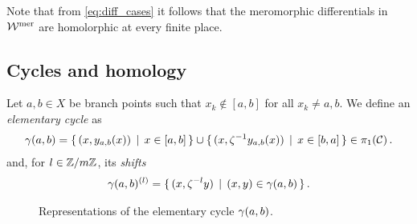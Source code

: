 \documentclass[main.tex]{subfiles}
\begin{document}
     \begin{rmk}
      Note that from \eqref{eq:diff_cases} it follows that the meromorphic differentials in $\mathcal{W}^{\text{mer}}$ are homolorphic at every finite place. 
     \end{rmk}
  
  \subsection{Cycles and homology}
    
   
   \begin{defn}
   Let $a, b \in X$ be branch points such that $x_k \not\in [a,b]$ for all $x_k \ne a,b$. We define an \textit{elementary cycle} as
   \begin{align}
    \gamma(a,b) = \{ \, (x,y_{a,b}(x)) \, \mid \, x \in [a,b] \, \} \cup \{ \,(x,\zeta^{-1} y_{a,b}(x)) \, \mid \, x \in [b,a] \, \} \in \pi_1(\mathcal{C})\,.
   \end{align}
   and, for $l \in \mathbb{Z}/m\mathbb{Z}$, its \textit{shifts}
   \begin{align}
    \gamma(a,b)^{(l)} = \{ \, (x,\zeta^{-l}y) \, \mid \, (x,y) \in \gamma(a,b) \, \}\,. 
   \end{align}
  \end{defn}
 
 
    \begin{figure}[H]
      \begin{center}
	  
      \end{center}
    \caption{Representations of the elementary cycle $\gamma(a,b)$.} 
    \label{fig:elem_cycle}
\end{figure}

 
    
  
  \newpage
  
\end{document}
